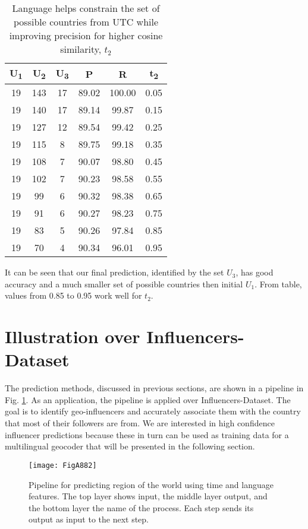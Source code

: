 \begin{table}[htbp]
\small
\caption[Constrain set of possible countries via language]{Language helps constrain the set of possible countries from UTC while improving precision for higher cosine similarity, $t_2$}
\label{table_4app}
\centering
\begin{tabular}{|c|c|c|c|c|c|}
\hline
\bfseries U\textsubscript{1} & \bfseries U\textsubscript{2} & \bfseries U\textsubscript{3} & \bfseries P & \bfseries R & \bfseries t\textsubscript{2} \\
\hline
19 & 143 & 17 & 89.02 & 100.00 & 0.05 \\
\hline
19 & 140 & 17 & 89.14 & 99.87 & 0.15 \\
\hline
19 & 127 & 12 & 89.54 & 99.42 & 0.25 \\
\hline
19 & 115 & 8 & 89.75 & 99.18 & 0.35 \\
\hline
19 & 108 & 7 & 90.07 & 98.80 & 0.45 \\
\hline
19 & 102 & 7 & 90.23 & 98.58 & 0.55 \\
\hline
19 & 99 & 6 & 90.32 & 98.38 & 0.65 \\
\hline
19 & 91 & 6 & 90.27 & 98.23 & 0.75 \\
\hline
19 & 83 & 5 & 90.26 & 97.84 & 0.85 \\
\hline
19 & 70 & 4 & 90.34 & 96.01 & 0.95 \\
\hline
\end{tabular}
\end{table}

It can be seen that our final prediction, identified by the set $U_3$, has good accuracy and a much smaller set of possible countries then initial $U_1$. From table, values from 0.85 to 0.95 work well for $t_2$.

\section{Illustration over Influencers-Dataset}
The prediction methods, discussed in previous sections, are shown in a pipeline in Fig. \ref{fig_6app}. As an application, the pipeline is applied over Influencers-Dataset. The goal is to identify geo-influencers and accurately associate them with the country that most of their followers are from. We are interested in high confidence influencer predictions because these in turn can be used as training data for a multilingual geocoder that will be presented in the following section. 

\begin{figure}[h!]
\centering
\texttt{[image: FigA882]}
\caption[Pipeline for predicting region of the world]{Pipeline for predicting region of the world using time and language features. The top layer shows input, the middle layer output, and the bottom layer the name of the process. Each step sends its output as input to the next step.}
\label{fig_6app}
\end{figure}

